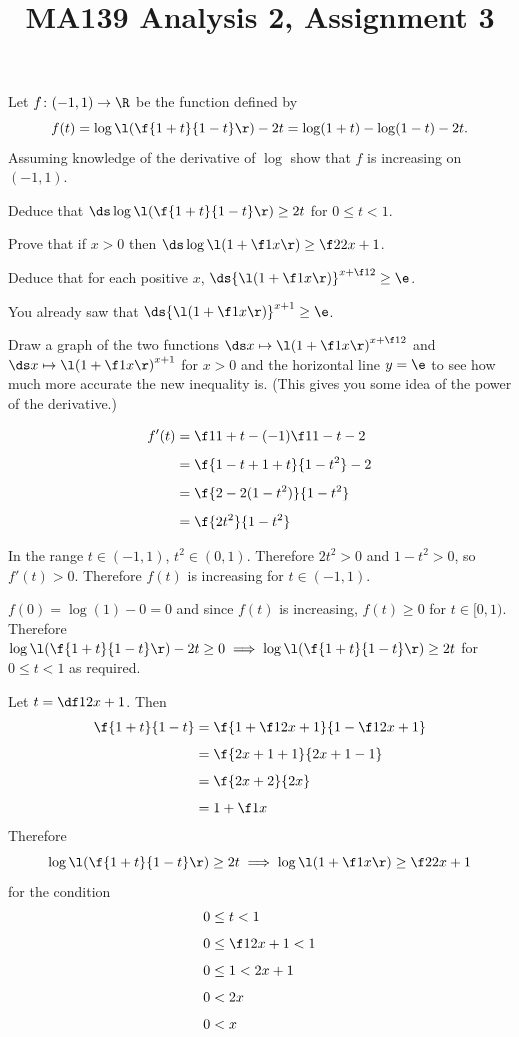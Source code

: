 \documentclass[a4paper]{article}
\title{MA139 Analysis 2, Assignment 3}
\begin{document}
\maketitle

\setlength{\parindent}{0em}
\setlength{\parskip}{1em}


\begin{questionbody}
Let $f \colon (-1, 1) \to \R$ be the function defined by \[
f(t) = \log\l( \f{1+t}{1-t} \r) - 2t = \log(1+t) - \log(1-t) - 2t.
\] Assuming knowledge of the derivative of $\log$ show that $f$ is increasing on $(-1, 1)$.

Deduce that $\ds\log\l( \f{1+t}{1-t} \r) \ge 2t$ for $0 \le t < 1$.

Prove that if $x > 0$ then $\ds\log\l( 1 + \f1x \r) \ge \f2{2x+1}$.

Deduce that for each positive $x$, $\ds{\l( 1 + \f1x \r)}^{x + \f12} \ge \e$.

You already saw that $\ds{\l( 1 + \f1x \r)}^{x + 1} \ge \e$.

Draw a graph of the two functions $\ds x \mapsto {\l( 1 + \f1x \r)}^{x + \f12}$ and $\ds x \mapsto {\l( 1 + \f1x \r)}^{x + 1}$ for $x > 0$ and the horizontal line $y = \e$ to see how much more accurate the new inequality is. (This gives you some idea of the power of the derivative.)
\end{questionbody}

\begin{align*}
f'(t) &= \f1{1+t} - (-1)\f1{1-t} - 2 \\[1ex]
&= \f{1-t + 1+t}{1-t^2} - 2 \\[1ex]
&= \f{2 - 2(1-t^2)}{1-t^2} \\[1ex]
&= \f{2t^2}{1-t^2}
\end{align*}

In the range $t \in (-1, 1)$, $t^2 \in (0, 1)$. Therefore $2t^2 > 0$ and $1 - t^2 > 0$, so $f'(t) > 0$. Therefore $f(t)$ is increasing for $t \in (-1, 1)$.

$f(0) = \log(1) - 0 = 0$ and since $f(t)$ is increasing, $f(t) \ge 0$ for $t \in [0, 1)$. %
Therefore $\log\l( \f{1+t}{1-t} \r) - 2t \ge 0 \implies \log\l( \f{1+t}{1-t} \r) \ge 2t$ for $0 \le t < 1$ as required.

Let $t = \df1{2x+1}$. Then \begin{align*}
\f{1+t}{1-t} &= \f{1 + \f1{2x+1}}{1 - \f1{2x+1}} \\[1ex]
&= \f{2x + 1 + 1}{2x + 1 - 1} \\[1ex]
&= \f{2x + 2}{2x} \\[1ex]
&= 1 + \f1x
\end{align*}
Therefore \[
\log\l( \f{1+t}{1-t} \r) \ge 2t \implies \log\l( 1 + \f1x \r) \ge \f2{2x+1}
\] for the condition \begin{align*}
0 &\le t < 1 \\[1ex]
0 &\le \f1{2x+1} < 1 \\[1ex]
0 &\le 1 < 2x + 1 \\[1ex]
0 &< 2x \\[1ex]
0 &< x
\end{align*}
\end{document}
